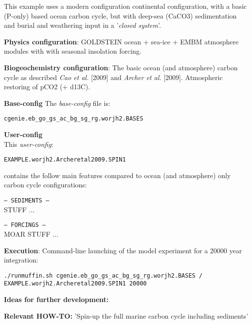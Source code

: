 \documentclass[10pt,twoside]{article}
\begin{document}
This example uses a modern configuration continental configuration, with a basic (P-only) based ocean carbon cycle, but with deep-sea (CaCO3) sedimentation and burial and weathering input in a '\textit{closed system}'.

\noindent \textbf{Physics configuration}: GOLDSTEIN ocean + sea-ice + EMBM atmosphere modules with with seasonal insolation forcing.

\noindent \textbf{Biogeochemistry configuration}: The basic ocean (and atmosphere) carbon cycle as described \textit{Cao et al.} [2009] and \textit{Archer et al.} [2009]. Atmospheric restoring of pCO2 (+ d13C).

\noindent \textbf{Base-config} The \textit{base-config} file is:
\vspace{-10pt}\begin{verbatim}cgenie.eb_go_gs_ac_bg_sg_rg.worjh2.BASES\end{verbatim}\vspace{-10pt}

\noindent \textbf{User-config} 
\\ This \textit{user-config}:
\vspace{-10pt}\begin{verbatim}EXAMPLE.worjh2.Archeretal2009.SPIN1\end{verbatim}\vspace{-10pt}
contains the follow main features compared to ocean (and atmosphere) only carbon cycle configurations:
\begin{compactitem}
                \item \texttt{--- SEDIMENTS ---}
                \\ STUFF ...
                \item \texttt{--- FORCINGS ---}
                \\ MOAR STUFF ...
        \end{compactitem}

\noindent \textbf{Execution}: Command-line launching of the model experiment for a 20000 year integration:
\vspace{-10pt}\begin{verbatim}./runmuffin.sh cgenie.eb_go_gs_ac_bg_sg_rg.worjh2.BASES /
EXAMPLE.worjh2.Archeretal2009.SPIN1 20000\end{verbatim}\vspace{-10pt}

\noindent \textbf{Ideas for further development:} 

\noindent \textbf{Relevant HOW-TO:} 'Spin-up the full marine carbon cycle including sediments'
\end{document}
